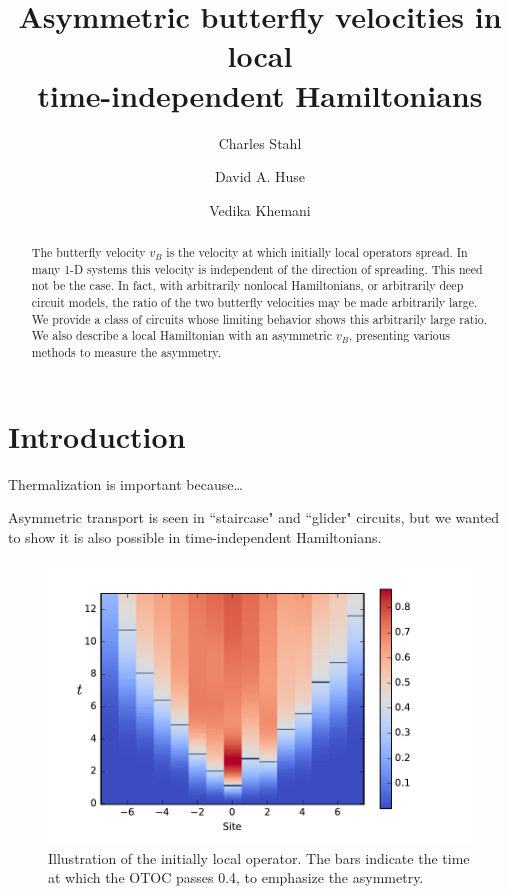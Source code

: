 \documentclass[aps,prl,reprint,superscriptaddress, longbibliography]{revtex4-1}
\begin{document}
\title{Asymmetric butterfly velocities in local\\ time-independent Hamiltonians
} 

\author{Charles Stahl}
\author{David A. Huse}
\author{Vedika Khemani}

\begin{abstract}
The butterfly velocity $v_B$ is the velocity at which initially local operators spread. In many 1-D systems this velocity is independent of the direction of spreading. This need not be the case. In fact, with arbitrarily nonlocal Hamiltonians, or arbitrarily deep circuit models, the ratio of the two butterfly velocities may be made arbitrarily large. We provide a class of circuits whose limiting behavior shows this arbitrarily large ratio. We also describe a local Hamiltonian with an asymmetric $v_B$, presenting various methods to measure the asymmetry.
\end{abstract}

\maketitle

\section{Introduction}

Thermalization is important because\dots

Asymmetric transport is seen in ``staircase" and ``glider" circuits, but we wanted to show it is also possible in time-independent Hamiltonians. 

\begin{figure}
	\includegraphics[width=\columnwidth]{colorplot}
	\caption{Illustration of the initially local operator. The bars indicate the time at which the OTOC passes 0.4, to emphasize the asymmetry.}
	\label{fig:colorplot}
\end{figure}
\end{document}
